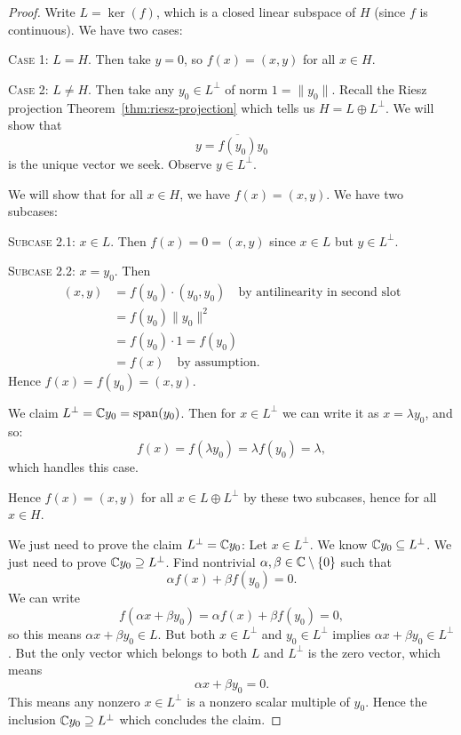 \begin{proof}
Write $L=\ker(f)$, which is a closed linear subspace of $H$ (since $f$
is continuous). We have two cases:

\textsc{Case 1}: $L=H$. Then take $y=0$, so $f(x)=(x,y)$ for all $x\in H$.

\textsc{Case 2}: $L\neq H$. Then take any $y_{0}\in L^{\perp}$ of norm
$1=\|y_{0}\|$. Recall the Riesz projection Theorem~\ref{thm:riesz-projection}
which tells us $H=L\oplus L^{\perp}$. We will show that
\begin{equation}
y = \overline{f(y_{0})}y_{0}
\end{equation}
is the unique vector we seek. Observe $y\in L^{\perp}$.

We will show that for all $x\in H$, we have $f(x)=(x,y)$. We have two
subcases:

\textsc{Subcase 2.1}: $x\in L$. Then $f(x)=0=(x,y)$ since $x\in L$ but
$y\in L^{\perp}$.

\textsc{Subcase 2.2}: $x=y_{0}$. Then
\begin{subequations}
  \begin{align}
(x,y) &= f(y_{0})\cdot(y_{0},y_{0})\quad\mbox{by antilinearity in second slot}\\
&= f(y_{0})\|y_{0}\|^{2}\\
&= f(y_{0})\cdot1=f(y_{0})\\
&=f(x)\quad\mbox{by assumption}.
  \end{align}
\end{subequations}
Hence $f(x)=f(y_{0})=(x,y)$.

We claim $L^{\perp}=\mathbb{C} y_{0}=\operatorname{span}(y_{0})$. Then for $x\in L^{\perp}$
we can write it as $x=\lambda y_{0}$, and so:
\begin{equation}
f(x)=f(\lambda y_{0})=\lambda f(y_{0})=\lambda,
\end{equation}
which handles this case.

Hence $f(x)=(x,y)$ for all $x\in L\oplus L^{\perp}$ by these two
subcases, hence for all $x\in H$.

We just need to prove the claim $L^{\perp}=\mathbb{C} y_{0}$: Let $x\in L^{\perp}$.
We know $\mathbb{C} y_{0}\subseteq L^{\perp}$. We just need to prove $\mathbb{C} y_{0}\supseteq L^{\perp}$.
Find nontrivial $\alpha,\beta\in\mathbb{C}\setminus\{0\}$ such that
\begin{equation}
\alpha f(x)+\beta f(y_{0})=0.
\end{equation}
We can write
\begin{equation}
f(\alpha x + \beta y_{0})=\alpha f(x)+\beta f(y_{0})=0,
\end{equation}
so this means $\alpha x + \beta y_{0}\in L$. But both $x\in L^{\perp}$
and $y_{0}\in L^{\perp}$ implies $\alpha x + \beta y_{0}\in L^{\perp}$.
But the only vector which belongs to both $L$ and $L^{\perp}$ is the
zero vector, which means
\begin{equation}
\alpha x + \beta y_{0} = 0.
\end{equation}
This means any nonzero $x\in L^{\perp}$ is a nonzero scalar multiple of $y_{0}$.
Hence the inclusion $\mathbb{C} y_{0}\supseteq L^{\perp}$ which concludes the claim.
\end{proof}

